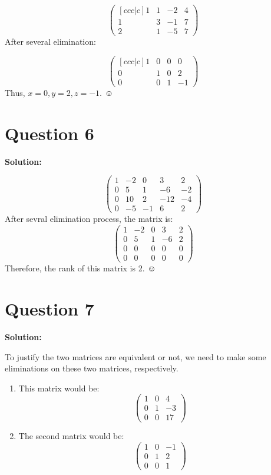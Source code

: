 \documentclass[11pt]{article} %
\begin{document}
$$\begin{pmatrix}[ccc|c]
	1&1&-2&4\\
	1&3&-1&7\\
	2&1&-5&7
\end{pmatrix}
$$
After several elimination:

$$\begin{pmatrix}[ccc|c]
	1&0&0&0\\
	0&1&0&2\\
	0&0&1&-1
\end{pmatrix}
$$
Thus, $x=0, y=2, z=-1$.	 $\smiley{}$

\section{Question 6}
\textbf{Solution:}

$$\begin{pmatrix}
	1&-2&0&3&2\\
	0&5&1&-6&-2\\
	0&10&2&-12&-4\\
	0&-5&-1&6&2
\end{pmatrix}
$$
After sevral elimination process, the matrix is: 
$$\begin{pmatrix}
	1&-2&0&3&2\\
	0&5&1&-6&2\\
	0&0&0&0&0\\
	0&0&0&0&0
\end{pmatrix}$$
Therefore, the rank of this matrix is 2. $\smiley{}$

\section{Question 7}
\textbf{Solution:}

To justify the two matrices are equivalent or not, we need to make some eliminations on these two matrices, respectively. 
\begin{enumerate}
	\item This matrix would be: 
	$$\begin{pmatrix}
		1&0&4\\
		0&1&-3\\
		0&0&17
	\end{pmatrix}$$
	\item The second matrix would be:
	$$\begin{pmatrix}
		1&0&-1\\
		0&1&2\\
		0&0&1
	\end{pmatrix}$$
\end{enumerate}
\end{document}
